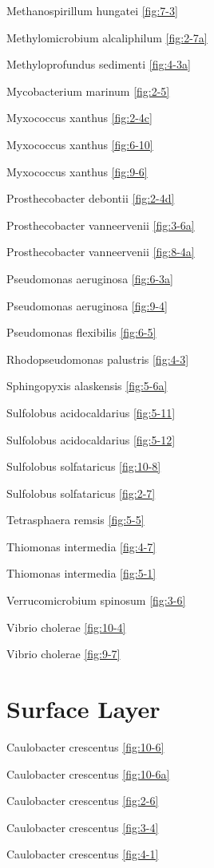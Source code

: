 \documentclass[]{tufte-book}
\begin{document}
Methanospirillum hungatei \ref{fig:7-3}

Methylomicrobium alcaliphilum \ref{fig:2-7a}

Methyloprofundus sedimenti \ref{fig:4-3a}

Mycobacterium marinum \ref{fig:2-5}

Myxococcus xanthus \ref{fig:2-4c}

Myxococcus xanthus \ref{fig:6-10}

Myxococcus xanthus \ref{fig:9-6}

Prosthecobacter debontii \ref{fig:2-4d}

Prosthecobacter vanneervenii \ref{fig:3-6a}

Prosthecobacter vanneervenii \ref{fig:8-4a}

Pseudomonas aeruginosa \ref{fig:6-3a}

Pseudomonas aeruginosa \ref{fig:9-4}

Pseudomonas flexibilis \ref{fig:6-5}

Rhodopseudomonas palustris \ref{fig:4-3}

Sphingopyxis alaskensis \ref{fig:5-6a}

Sulfolobus acidocaldarius \ref{fig:5-11}

Sulfolobus acidocaldarius \ref{fig:5-12}

Sulfolobus solfataricus \ref{fig:10-8}

Sulfolobus solfataricus \ref{fig:2-7}

Tetrasphaera remsis \ref{fig:5-5}

Thiomonas intermedia \ref{fig:4-7}

Thiomonas intermedia \ref{fig:5-1}

Verrucomicrobium spinosum \ref{fig:3-6}

Vibrio cholerae \ref{fig:10-4}

Vibrio cholerae \ref{fig:9-7}

\section*{Surface Layer}\label{surface-layer}

Caulobacter crescentus \ref{fig:10-6}

Caulobacter crescentus \ref{fig:10-6a}

Caulobacter crescentus \ref{fig:2-6}

Caulobacter crescentus \ref{fig:3-4}

Caulobacter crescentus \ref{fig:4-1}
\end{document}
